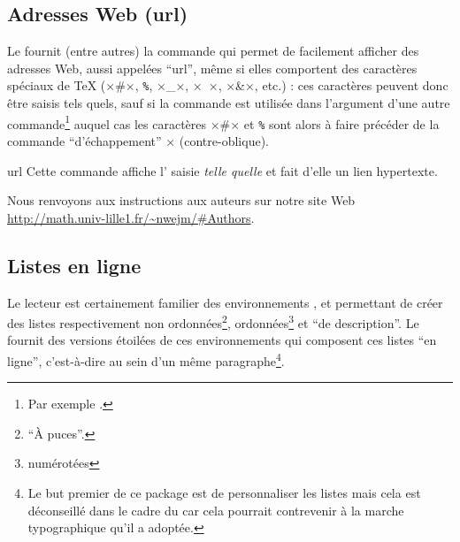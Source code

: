 \documentclass[french,nolocaltoc]{nwejmart}
\newtheorem[style=definition]{fait}
\newtheorem[title=contraventionnalisation]{ctrv}
\newtheorem[title-plural=anneaux]{anneau}
\newtheorem[title-plural=idéaux]{idéal}
\begin{document}

\subsection{Adresses Web (\texorpdfstring{\acrshort{url}}{URL})}
\label{sec-url}

Le  fournit (entre autres) la commande  qui
permet de facilement afficher des adresses Web, aussi appelées
\enquote{\gls{url}}, même si elles comportent des caractères spéciaux de \TeX{}
(×#×,
%
\lstinline[commentstyle={}]+%+,
%
×_×, ×~×, ×&×, etc.) : ces caractères peuvent donc être saisis tels quels, sauf
si la commande  est utilisée dans l'argument d'une autre
commande\footnote{Par exemple \protect{}.} auquel cas les
caractères ×#× et
%
\lstinline[commentstyle={}]+%+
%
sont alors à faire précéder de la commande \enquote{d'échappement} ×\×
(contre-oblique).%

\begin{docCommand}{url}{}
  Cette commande affiche l' saisie \emph{telle quelle} et fait
  d'elle un lien hypertexte.
\begin{bodycode}[listing and text,listing options={alsolanguage={[hyperref]TeX},deletekeywords={[2]url}}]
Nous renvoyons aux instructions aux auteurs sur notre site Web
\url{http://math.univ-lille1.fr/~nwejm/#Authors}.
\end{bodycode}
\end{docCommand}

\subsection{Listes en ligne}
\label{sec:listes-en-ligne}

Le lecteur est certainement familier des environnements
,  et
 permettant de créer des listes respectivement
non ordonnées\footnote{\enquote{À puces}.}, ordonnées\footnote{\Ie*{}
  numérotées} et \enquote{de description}. Le  fournit des
versions étoilées de ces environnements qui composent ces listes \enquote{en
  ligne}, c'est-à-dire au sein d'un même paragraphe\footnote{Le but premier de
  ce package est de personnaliser les listes mais cela est déconseillé dans le
  cadre du \nwejm{} car cela pourrait contrevenir à la marche typographique
  qu'il a adoptée.}.
\end{document}
